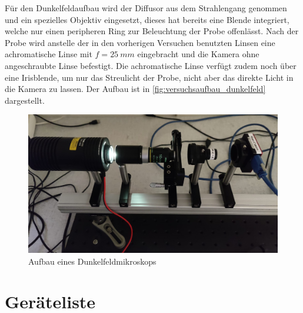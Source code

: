 \documentclass[english, ngerman]{scrartcl}
\begin{document}
Für den Dunkelfeldaufbau wird der Diffusor aus dem Strahlengang genommen und ein spezielles Objektiv eingesetzt, dieses hat bereits eine Blende integriert, welche nur einen peripheren Ring zur Beleuchtung der Probe offenlässt. Nach der Probe wird anstelle der in den vorherigen Versuchen benutzten Linsen eine achromatische Linse mit $f = \SI{25}{mm}$ eingebracht und die Kamera ohne angeschraubte Linse befestigt. Die achromatische Linse verfügt zudem noch über eine Irisblende, um nur das Streulicht der Probe, nicht aber das direkte Licht in die Kamera zu lassen. Der Aufbau ist in \autoref{fig:versuchsaufbau_dunkelfeld} dargestellt.
%
\begin{figure}
    \centering
    \begin{samepage}
        \includegraphics[width=0.85\linewidth]{fig/Dunkelfeld.jpeg}
        \caption{Aufbau eines Dunkelfeldmikroskops}
        \label{fig:versuchsaufbau_dunkelfeld}
    \end{samepage}
\end{figure}



\section{Geräteliste}
\label{sec:geraeteliste}
\end{document}
